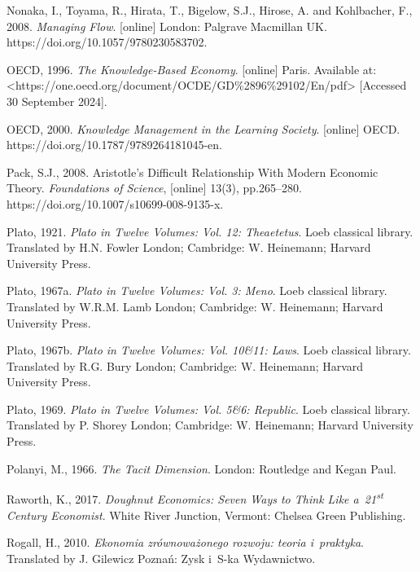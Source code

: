 Nonaka, I., Toyama, R., Hirata, T., Bigelow, S.J., Hirose, A. and Kohlbacher, F., 2008. \textit{Managing Flow}. [online] London: Palgrave Macmillan UK. https://doi.org/10.1057/9780230583702.



OECD, 1996. \textit{The Knowledge-Based Economy}. [online] Paris. Available at: {\textless}https://one.oecd.org/document/OCDE/GD\%2896\%29102/En/pdf{\textgreater} [Accessed 30 September 2024].



OECD, 2000. \textit{Knowledge Management in the Learning Society}. [online] OECD. https://doi.org/10.1787/9789264181045-en.



Pack, S.J., 2008. Aristotle's Difficult Relationship With Modern Economic Theory. \textit{Foundations of Science}, [online] 13(3), pp.265–280. https://doi.org/10.1007/s10699-008-9135-x.



Plato, 1921. \textit{Plato in Twelve Volumes: Vol. 12: Theaetetus}. Loeb classical library. Translated by H.N. Fowler London; Cambridge: W. Heinemann; Harvard University Press.



Plato, 1967a. \textit{Plato in Twelve Volumes: Vol. 3: Meno}. Loeb classical library. Translated by W.R.M. Lamb London; Cambridge: W. Heinemann; Harvard University Press.



Plato, 1967b. \textit{Plato in Twelve Volumes: Vol. 10\&11: Laws}. Loeb classical library. Translated by R.G. Bury London; Cambridge: W. Heinemann; Harvard University Press.



Plato, 1969. \textit{Plato in Twelve Volumes: Vol. 5\&6: Republic}. Loeb classical library. Translated by P. Shorey London; Cambridge: W. Heinemann; Harvard University Press.



Polanyi, M., 1966. \textit{The Tacit Dimension}. London: Routledge and Kegan Paul.



Raworth, K., 2017. \textit{Doughnut Economics: Seven Ways to Think Like a~21\textsuperscript{st} Century Economist}. White River Junction, Vermont: Chelsea Green Publishing.



Rogall, H., 2010. \textit{Ekonomia zrównoważonego rozwoju: teoria i~praktyka}. Translated by J. Gilewicz Poznań: Zysk i~S-ka Wydawnictwo.



